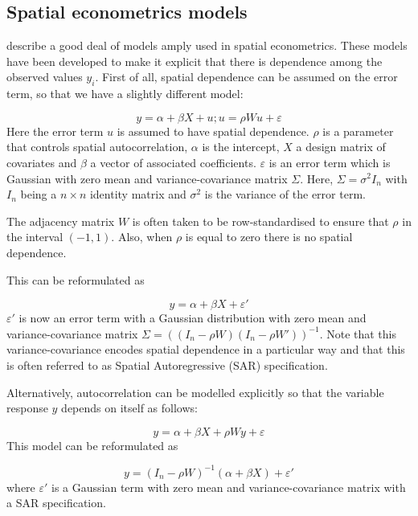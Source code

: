 \documentclass[article]{jss}
\begin{document}
\subsection{Spatial econometrics models}

\citet{LeSagePace:2009} describe a good deal of models amply used in spatial
econometrics. These models have been developed to make it explicit that there
is dependence among the observed values $y_i$. First of all, spatial dependence
can be assumed on the error term, so that we have a slightly different model:

\begin{equation}
y= \alpha+\beta X +u; u=\rho W u+\varepsilon
\end{equation}
\noindent
Here the error term $u$ is assumed to have spatial dependence.  $\rho$ is a
parameter that controls spatial autocorrelation, $\alpha$ is the intercept, $X$
a design matrix of covariates and $\beta$ a vector of associated coefficients.
$\varepsilon$ is an error term which is Gaussian with zero mean and
variance-covariance matrix $\Sigma$. Here, $\Sigma = \sigma^2 I_n$ with $I_n$
being a $n\times n$ identity matrix and $\sigma^2$ is the variance of the error
term.


The adjacency matrix $W$ is often taken to be row-standardised \citep[see, for
example,][]{Haining:2003} to ensure that $\rho$ in the interval $(-1, 1)$.
Also, when $\rho$ is equal to zero there is no spatial dependence.

This can be reformulated as

\begin{equation}
y= \alpha+\beta X+\varepsilon'
\end{equation}
\noindent
$\varepsilon '$ is now an error term with a Gaussian distribution with zero
mean and variance-covariance matrix $\Sigma=((I_n-\rho W)(I_n-\rho W'))^{-1}$.
Note that this variance-covariance encodes spatial dependence in a particular
way and that this is often referred to as Spatial Autoregressive (SAR)
specification.


Alternatively, autocorrelation can be modelled explicitly so that the
variable response $y$ depends on itself as follows:

\begin{equation}
y= \alpha+\beta X+\rho W y +\varepsilon 
\end{equation}
\noindent
This model can be reformulated as

\begin{equation}
y = (I_n-\rho W)^{-1}(\alpha+\beta X)+\varepsilon ' 
\label{eq:slm}
\end{equation}
\noindent
where $\varepsilon '$ is a Gaussian term with zero mean and
variance-covariance matrix with a SAR specification.
\end{document}
